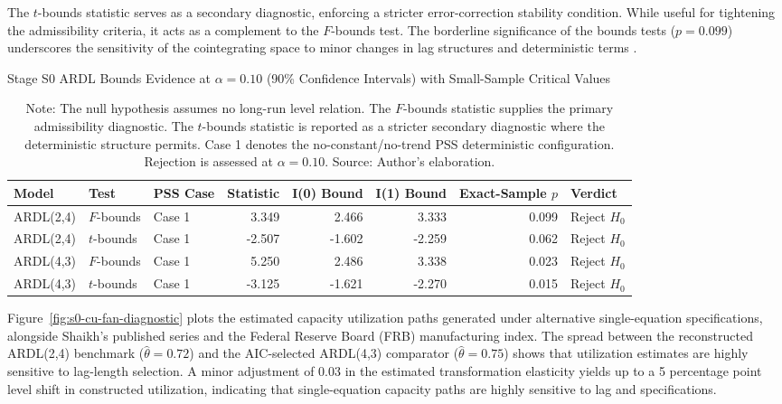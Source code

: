 \documentclass[11pt]{article}
\begin{document}
The $t$-bounds statistic serves as a secondary diagnostic, enforcing a stricter error-correction stability condition. While useful for tightening the admissibility criteria, it acts as a complement to the $F$-bounds test. The borderline significance of the bounds tests ($p=0.099$) underscores the sensitivity of the cointegrating space to minor changes in lag structures and deterministic terms \citep{Pesaran2001}.
\begin{table}[H]
\centering
\caption{Stage S0 ARDL Bounds Evidence at $\alpha=0.10$ (90\% Confidence Intervals) with Small-Sample Critical Values}
\label{tab:s0_bounds_alpha10}
\footnotesize
\begin{tabular}{lllrrrrl}
\toprule
Model & Test & PSS Case & Statistic & I(0) Bound & I(1) Bound & Exact-Sample $p$ & Verdict \\
\midrule
\midrule
ARDL(2,4) & $F$-bounds & Case 1 & 3.349 & 2.466 & 3.333 & 0.099 & Reject $H_0$ \\
ARDL(2,4) & $t$-bounds & Case 1 & -2.507 & -1.602 & -2.259 & 0.062 & Reject $H_0$ \\
ARDL(4,3) & $F$-bounds & Case 1 & 5.250 & 2.486 & 3.338 & 0.023 & Reject $H_0$ \\
ARDL(4,3) & $t$-bounds & Case 1 & -3.125 & -1.621 & -2.270 & 0.015 & Reject $H_0$ \\
\bottomrule
\end{tabular}
\caption*{Note: The null hypothesis assumes no long-run level relation. The $F$-bounds statistic supplies the primary admissibility diagnostic. The $t$-bounds statistic is reported as a stricter secondary diagnostic where the deterministic structure permits. Case 1 denotes the no-constant/no-trend PSS deterministic configuration. Rejection is assessed at $\alpha=0.10$. Source: Author's elaboration.}
\end{table}

Figure~\ref{fig:s0-cu-fan-diagnostic} plots the estimated capacity utilization paths generated under alternative single-equation specifications, alongside Shaikh's published series and the Federal Reserve Board (FRB) manufacturing index. The spread between the reconstructed ARDL(2,4) benchmark ($\hat{\theta}=0.72$) and the AIC-selected ARDL(4,3) comparator ($\hat{\theta}=0.75$) shows that utilization estimates are highly sensitive to lag-length selection. A minor adjustment of 0.03 in the estimated transformation elasticity yields up to a 5 percentage point level shift in constructed utilization, indicating that single-equation capacity paths are highly sensitive to lag and specifications.
\end{document}
